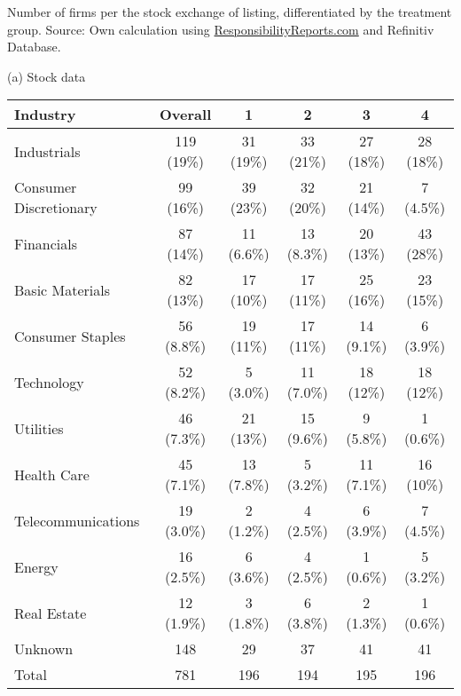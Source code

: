 \documentclass[12pt]{article}
\begin{document}
\begin{table}
    \vspace{0.2cm}

    \begin{tablenotes}
        \footnotesize
        \item Number of firms per the stock exchange of listing, differentiated by the treatment group. Source: Own calculation using \href{https://responsibilityreports.com}{ResponsibilityReports.com} and Refinitiv Database.
    \end{tablenotes}

\end{table}






\begin{table}
    \centering
    \label{tab:industries}

    (a) Stock data
    \vspace{0.5cm}

    \begin{tabular}{lccccc}
    \toprule
    Industry & Overall & 1 & 2 & 3 & 4 \\
    \midrule
    Industrials & 119 (19\%) & 31 (19\%) & 33 (21\%) & 27 (18\%) & 28 (18\%)\\
    Consumer Discretionary & 99 (16\%) & 39 (23\%) & 32 (20\%) & 21 (14\%) & 7 (4.5\%)\\
    Financials & 87 (14\%) & 11 (6.6\%) & 13 (8.3\%) & 20 (13\%) & 43 (28\%)\\
    Basic Materials & 82 (13\%) & 17 (10\%) & 17 (11\%) & 25 (16\%) & 23 (15\%)\\
    Consumer Staples & 56 (8.8\%) & 19 (11\%) & 17 (11\%) & 14 (9.1\%) & 6 (3.9\%)\\
    Technology & 52 (8.2\%) & 5 (3.0\%) & 11 (7.0\%) & 18 (12\%) & 18 (12\%)\\
    Utilities & 46 (7.3\%) & 21 (13\%) & 15 (9.6\%) & 9 (5.8\%) & 1 (0.6\%)\\
    Health Care & 45 (7.1\%) & 13 (7.8\%) & 5 (3.2\%) & 11 (7.1\%) & 16 (10\%)\\
    Telecommunications & 19 (3.0\%) & 2 (1.2\%) & 4 (2.5\%) & 6 (3.9\%) & 7 (4.5\%)\\
    Energy & 16 (2.5\%) & 6 (3.6\%) & 4 (2.5\%) & 1 (0.6\%) & 5 (3.2\%)\\
    Real Estate & 12 (1.9\%) & 3 (1.8\%) & 6 (3.8\%) & 2 (1.3\%) & 1 (0.6\%)\\
    Unknown & 148 & 29 & 37 & 41 & 41\\
    \midrule 
    Total & 781 & 196 & 194 & 195 & 196\\
    \bottomrule
    \end{tabular}


\end{table}
\end{document}
